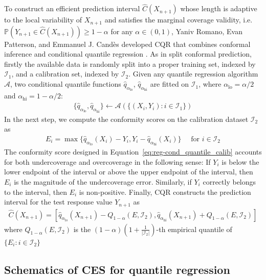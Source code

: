 To construct an efficient prediction interval $\hat{C}(X_{n+1})$ whose length is adaptive to the local variability of $X_{n+1}$ and satisfies the marginal coverage validity, i.e. $\mathbb{P}(Y_{n+1} \in \hat{C}(X_{n+1})) \geq 1-\alpha$ for any $\alpha \in (0,1)$, Yaniv Romano, Evan Patterson, and Emmanuel J. Candès developed CQR that combines conformal inference \cite{vovk1999machine} \cite{vovk2005algorithmic} and conditional quantile regression \cite{koenker1978quantreg}. As in split conformal prediction, firstly the available data is  randomly split into a proper training set, indexed by $\mathcal{I}_1$, and a calibration set, indexed by $\mathcal{I}_2$. Given any quantile regression algorithm $\mathcal{A}$, two conditional quantile functions $\hat{q}_{\alpha_{\text{lo}}}$, $\hat{q}_{\alpha_{\text{hi}}}$ are fitted on $\mathcal{I}_1$, where $\alpha_{\text{lo}} = \alpha/2$ and $\alpha_{\text{hi}} = 1-\alpha/2$: 
\begin{align} \label{eq:reg-cond_quantile_fit}
    \{ \hat{q}_{\alpha_{\text{lo}}}, \hat{q}_{\alpha_{\text{hi}}} \} \leftarrow \mathcal{A}(\{ (X_i, Y_i): i \in \mathcal{I}_1 \})
\end{align}
In the next step, we compute the conformity scores on the calibration dataset $\mathcal{I}_2$ as 
\begin{align} \label{eq:reg-cond_quantile_calib}
    E_i = \max \{ \hat{q}_{\alpha_{\text{lo}}}(X_i) - Y_i, Y_i - \hat{q}_{\alpha_{\text{hi}}}(X_i) \} \quad \text{ for } i \in \mathcal{I}_2
\end{align}
The conformity score designed in Equation~\ref{eq:reg-cond_quantile_calib} accounts for both undercoverage and overcoverage in the following sense: If $Y_i$ is below the lower endpoint of the interval or above the upper endpoint of the interval, then $E_i$ is the magnitude of the undercoverage error. Similarly, if $Y_i$ correctly belongs to the interval, then $E_i$ is non-positive. 
Finally, CQR constructs the prediction interval for the test response value $Y_{n+1}$ as
\begin{align} \label{eq:reg-cond_quantile_construct_pi}
    \hat{C}(X_{n+1}) = [ \hat{q}_{\alpha_{\text{lo}}}(X_{n+1}) - Q_{1-\alpha}(E, \mathcal{I}_2), \hat{q}_{\alpha_{\text{hi}}}(X_{n+1}) + Q_{1-\alpha}(E, \mathcal{I}_2)
    ]
\end{align}
where $Q_{1-\alpha}(E, \mathcal{I}_2)$ is the $(1-\alpha)(1+\frac{1}{|\mathcal{I}_2|})$-th empirical quantile of $\{E_i: i\in \mathcal{I}_2\}$
 \color{black}


\subsection{Schematics of CES for quantile regression}

